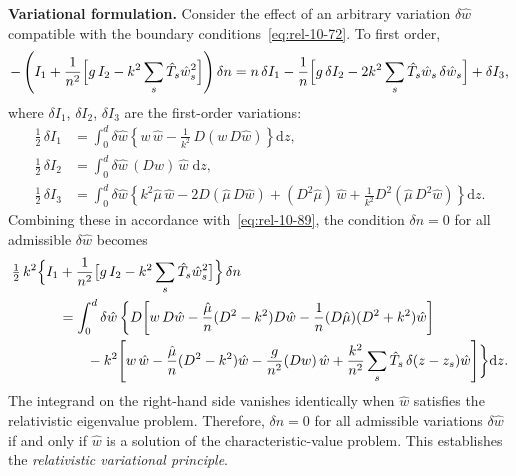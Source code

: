 \medskip\noindent\textbf{Variational formulation.}
Consider the effect of an arbitrary variation $\delta\hat{w}$
compatible with the boundary conditions~\eqref{eq:rel-10-72}.  To
first order,
\begin{equation}\label{eq:rel-10-89}
  -\left(I_{1} + \frac{1}{n^{2}}\Bigl[g\,I_{2}
  - k^{2}\sum_{s}\hat{T}_{s}\hat{w}_{s}^{2}\Bigr]\right)\delta n
  = n\,\delta I_{1}
  - \frac{1}{n}\Bigl[g\,\delta I_{2}
    - 2k^{2}\sum_{s}\hat{T}_{s}\hat{w}_{s}\,\delta\hat{w}_{s}\Bigr]
  + \delta I_{3},
\end{equation}
where $\delta I_{1}$, $\delta I_{2}$, $\delta I_{3}$ are the
first-order variations:
\begin{align}
  \tfrac{1}{2}\,\delta I_{1}
  &= \int_{0}^{d}\delta\hat{w}\!\left\{
    w\,\hat{w}
    - \frac{1}{k^{2}}\,D(w\,D\hat{w})\right\}\mathrm{d}z,
  \label{eq:rel-10-91}\\[6pt]
  \tfrac{1}{2}\,\delta I_{2}
  &= \int_{0}^{d}\delta\hat{w}\,(Dw)\,\hat{w}\;\mathrm{d}z,
  \label{eq:rel-10-92}\\[6pt]
  \tfrac{1}{2}\,\delta I_{3}
  &= \int_{0}^{d}\delta\hat{w}\!\left\{
    k^{2}\hat{\mu}\,\hat{w}
    - 2D(\hat{\mu}\,D\hat{w})
    + (D^{2}\hat{\mu})\,\hat{w}
    + \frac{1}{k^{2}}D^{2}(\hat{\mu}\,D^{2}\hat{w})\right\}
    \mathrm{d}z.
  \label{eq:rel-10-93}
\end{align}
Combining these in accordance with~\eqref{eq:rel-10-89}, the
condition $\delta n = 0$ for all admissible $\delta\hat{w}$ becomes
\begin{align}\label{eq:rel-10-94}
  \tfrac{1}{2}\,k^{2}\Bigl\{I_{1}
  &+ \frac{1}{n^{2}}\bigl[g\,I_{2}
    - k^{2}\sum_{s}\hat{T}_{s}\hat{w}_{s}^{2}\bigr]\Bigr\}
    \,\delta n
  \nonumber\\
  &= \int_{0}^{d}\delta\hat{w}\,\biggl\{
    D\!\left[w\,D\hat{w}
      - \frac{\hat{\mu}}{n}(D^{2} - k^{2})D\hat{w}
      - \frac{1}{n}(D\hat{\mu})(D^{2}+k^{2})\hat{w}
    \right]
  \nonumber\\
  &\qquad
    - k^{2}\!\left[
      w\,\hat{w}
      - \frac{\hat{\mu}}{n}(D^{2} - k^{2})\hat{w}
      - \frac{g}{n^{2}}(Dw)\,\hat{w}
      + \frac{k^{2}}{n^{2}}\sum_{s}\hat{T}_{s}\,
        \delta(z - z_{s})\hat{w}
    \right]\biggr\}\mathrm{d}z.
\end{align}
The integrand on the right-hand side vanishes identically when
$\hat{w}$ satisfies the relativistic eigenvalue problem.  Therefore,
$\delta n = 0$ for all admissible variations $\delta\hat{w}$ if and
only if $\hat{w}$ is a solution of the characteristic-value problem.
This establishes the \emph{relativistic variational principle}.

